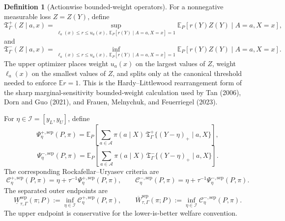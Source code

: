 \documentclass[11pt]{article}
\newcommand{\E}{\mathbb{E}}
\theoremstyle{definition}
\newtheorem{definition}{Definition}
\theoremstyle{plain}
\theoremstyle{remark}
\begin{document}
\begin{definition}[Actionwise bounded-weight operators]
For a nonnegative measurable loss \(Z=Z(Y)\), define
\[
\mathfrak T_{\Gamma}^{+}(Z\mid a,x)
=
\sup_{\ell_a(x)\le r\le u_a(x),\ \E_P[r(Y)\mid A=a,X=x]=1}
\E_P[r(Y)Z(Y)\mid A=a,X=x],
\]
and
\[
\mathfrak T_{\Gamma}^{-}(Z\mid a,x)
=
\inf_{\ell_a(x)\le r\le u_a(x),\ \E_P[r(Y)\mid A=a,X=x]=1}
\E_P[r(Y)Z(Y)\mid A=a,X=x].
\]
The upper optimizer places weight \(u_a(x)\) on the largest values of \(Z\),
weight \(\ell_a(x)\) on the smallest values of \(Z\), and splits only at the
canonical threshold needed to enforce \(\E r=1\).  This is the
Hardy--Littlewood rearrangement form of the sharp marginal-sensitivity
bounded-weight calculation used by Tan (2006), Dorn and Guo (2021), and Frauen,
Melnychuk, and Feuerriegel (2023).
\end{definition}

For \(\eta\in\mathcal I=[y_L,y_U]\), define
\[
\Psi_\eta^{+,\mathrm{sep}}(P,\pi)=
\E_P\left[
\sum_{a\in\mathcal A}\pi(a\mid X)\,
\mathfrak T_{\Gamma}^{+}\{(Y-\eta)_+\mid a,X\}
\right],
\]
\[
\Psi_\eta^{-,\mathrm{sep}}(P,\pi)=
\E_P\left[
\sum_{a\in\mathcal A}\pi(a\mid X)\,
\mathfrak T_{\Gamma}^{-}\{(Y-\eta)_+\mid a,X\}
\right].
\]
The corresponding Rockafellar--Uryasev criteria are
\[
\mathcal C_\eta^{+,\mathrm{sep}}(P,\pi)
=
\eta+\tau^{-1}\Psi_\eta^{+,\mathrm{sep}}(P,\pi),
\qquad
\mathcal C_\eta^{-,\mathrm{sep}}(P,\pi)
=
\eta+\tau^{-1}\Psi_\eta^{-,\mathrm{sep}}(P,\pi).
\]
The separated outer endpoints are
\[
\underline W_{\tau,\Gamma}^{\mathrm{sep}}(\pi;P)
:=
\inf_{\eta\in\mathcal I}\mathcal C_\eta^{+,\mathrm{sep}}(P,\pi),
\qquad
\overline W_{\tau,\Gamma}^{\mathrm{sep}}(\pi;P)
:=
\inf_{\eta\in\mathcal I}\mathcal C_\eta^{-,\mathrm{sep}}(P,\pi).
\]
The upper endpoint is conservative for the lower-is-better welfare convention.
\end{document}
